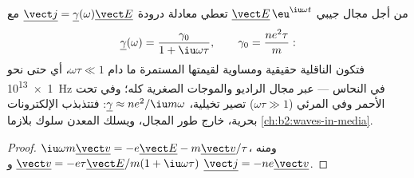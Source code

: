 \begin{proposition}\label{prop:b2:charges-currents-conduction:acdrude}
من أجل مجال جيبي $\underline{\vect E}\,\eu^{\iu\omega t}$ تعطي معادلة درودة
$\underline{\vect j} = \underline\gamma(\omega)\underline{\vect E}$ مع
\[
\underline\gamma(\omega) = \frac{\gamma_0}{1 + \iu\omega\tau} , \qquad \gamma_0 = \frac{ne^2\tau}{m} :
\]
فتكون الناقلية حقيقية ومساوية لقيمتها المستمرة ما دام $\omega\tau
\ll 1$، أي حتى نحو \qty{1e13}{Hz} في النحاس --- عبر مجال
الراديو والموجات الصغرية كله؛ وفي تحت الأحمر وفي المرئي ($\omega\tau \gg 1$)
تصير تخيلية، $\underline\gamma \approx ne^2/\iu m\omega$: فتتذبذب الإلكترونات
بحرية، خارج طور المجال، ويسلك المعدن
سلوك بلازما \cref{ch:b2:waves-in-media}.
\end{proposition}

\begin{proof}
$\iu\omega m\underline{\vect v} = -e\underline{\vect E} - m\underline{\vect v}/\tau$، ومنه
$\underline{\vect v} = -e\tau\underline{\vect E}/m(1 + \iu\omega\tau)$ و $\underline{\vect j}
= -ne\underline{\vect v}$.
\end{proof}

